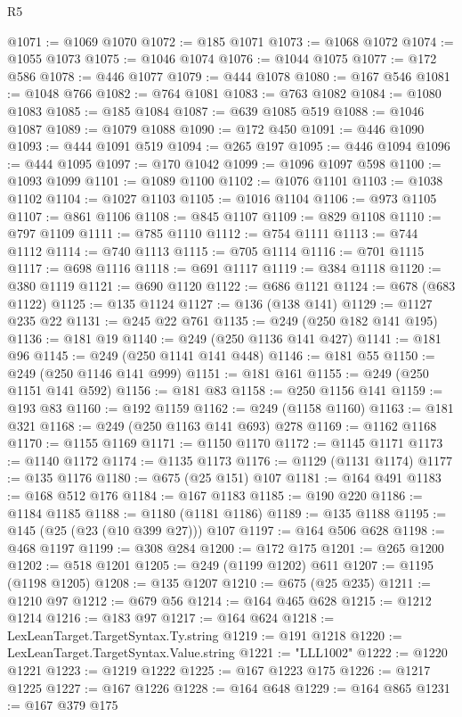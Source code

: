 \begin{lexlean}{R5}
\begin{coremodule}
{{{{{{{{{{{{{{{{{{{{{{{{{{{{{{{{{{{{{{{{{{{{{{{{{{{{{{{{{{{{{{@1071 := @1069 @1070
@1072 := @185 @1071
@1073 := @1068 @1072
@1074 := @1055 @1073
@1075 := @1046 @1074
@1076 := @1044 @1075
@1077 := @172 @586
@1078 := @446 @1077
@1079 := @444 @1078
@1080 := @167 @546
@1081 := @1048 @766
@1082 := @764 @1081
@1083 := @763 @1082
@1084 := @1080 @1083
@1085 := @185 @1084
@1087 := @639 @1085 @519
@1088 := @1046 @1087
@1089 := @1079 @1088
@1090 := @172 @450
@1091 := @446 @1090
@1093 := @444 @1091 @519
@1094 := @265 @197
@1095 := @446 @1094
@1096 := @444 @1095
@1097 := @170 @1042
@1099 := @1096 @1097 @598
@1100 := @1093 @1099
@1101 := @1089 @1100
@1102 := @1076 @1101
@1103 := @1038 @1102
@1104 := @1027 @1103
@1105 := @1016 @1104
@1106 := @973 @1105
@1107 := @861 @1106
@1108 := @845 @1107
@1109 := @829 @1108
@1110 := @797 @1109
@1111 := @785 @1110
@1112 := @754 @1111
@1113 := @744 @1112
@1114 := @740 @1113
@1115 := @705 @1114
@1116 := @701 @1115
@1117 := @698 @1116
@1118 := @691 @1117
@1119 := @384 @1118
@1120 := @380 @1119
@1121 := @690 @1120
@1122 := @686 @1121
@1124 := @678 (@683 @1122)
@1125 := @135 @1124
@1127 := @136 (@138 @141)
@1129 := @1127 @235 @22
@1131 := @245 @22 @761
@1135 := @249 (@250 @182 @141 @195)
@1136 := @181 @19
@1140 := @249 (@250 @1136 @141 @427)
@1141 := @181 @96
@1145 := @249 (@250 @1141 @141 @448)
@1146 := @181 @55
@1150 := @249 (@250 @1146 @141 @999)
@1151 := @181 @161
@1155 := @249 (@250 @1151 @141 @592)
@1156 := @181 @83
@1158 := @250 @1156 @141
@1159 := @193 @83
@1160 := @192 @1159
@1162 := @249 (@1158 @1160)
@1163 := @181 @321
@1168 := @249 (@250 @1163 @141 @693) @278
@1169 := @1162 @1168
@1170 := @1155 @1169
@1171 := @1150 @1170
@1172 := @1145 @1171
@1173 := @1140 @1172
@1174 := @1135 @1173
@1176 := @1129 (@1131 @1174)
@1177 := @135 @1176
@1180 := @675 (@25 @151) @107
@1181 := @164 @491
@1183 := @168 @512 @176
@1184 := @167 @1183
@1185 := @190 @220
@1186 := @1184 @1185
@1188 := @1180 (@1181 @1186)
@1189 := @135 @1188
@1195 := @145 (@25 (@23 (@10 @399 @27))) @107
@1197 := @164 @506 @628
@1198 := @468 @1197
@1199 := @308 @284
@1200 := @172 @175
@1201 := @265 @1200
@1202 := @518 @1201
@1205 := @249 (@1199 @1202) @611
@1207 := @1195 (@1198 @1205)
@1208 := @135 @1207
@1210 := @675 (@25 @235)
@1211 := @1210 @97
@1212 := @679 @56
@1214 := @164 @465 @628
@1215 := @1212 @1214
@1216 := @183 @97
@1217 := @164 @624
@1218 := LexLeanTarget.TargetSyntax.Ty.string
@1219 := @191 @1218
@1220 := LexLeanTarget.TargetSyntax.Value.string
@1221 := "LLL1002"
@1222 := @1220 @1221
@1223 := @1219 @1222
@1225 := @167 @1223 @175
@1226 := @1217 @1225
@1227 := @167 @1226
@1228 := @164 @648
@1229 := @164 @865
@1231 := @167 @379 @175
}}}}}}}}}}}}}}}}}}}}}}}}}}}}}}}}}}}}}}}}}}}}}}}}}}}}}}}}}}}}}}
\end{coremodule}
\end{lexlean}
